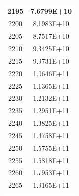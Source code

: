 \documentclass[a4paper]{article}
\begin{document}
\begin{tabular}{|c|c|}
		2195 & 7.6799E+10 \\
		\hline
		2200 & 8.1983E+10 \\
		\hline
		2205 & 8.7517E+10 \\
		\hline
		2210 & 9.3425E+10 \\
		\hline
		2215 & 9.9731E+10 \\
		\hline
		2220 & 1.0646E+11 \\
		\hline
		2225 & 1.1365E+11 \\
		\hline
		2230 & 1.2132E+11 \\
		\hline
		2235 & 1.2951E+11 \\
		\hline
		2240 & 1.3825E+11 \\
		\hline
		2245 & 1.4758E+11 \\
		\hline
		2250 & 1.5755E+11 \\
		\hline
		2255 & 1.6818E+11 \\
		\hline
		2260 & 1.7953E+11 \\
		\hline
		2265 & 1.9165E+11 \\
		\hline
	\end{tabular}
	\hfill
\end{document}
